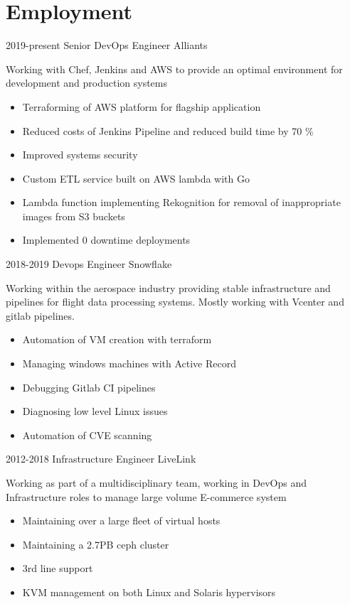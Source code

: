 \documentclass[]{friggeri-cv-a4}
\begin{document}
\section{Employment}
 \begin{entrylist}
  \entry
  	{2019-present}
  	{Senior DevOps Engineer}
  	{Alliants}
  	{Working with Chef, Jenkins and AWS to provide an optimal environment for development and production systems
      \begin{itemize}
        \item Terraforming of AWS platform for flagship application
        \item Reduced costs of Jenkins Pipeline and reduced build time by 70 \%
        \item Improved systems security
        \item Custom ETL service built on AWS lambda with Go
        \item Lambda function implementing Rekognition for removal of inappropriate images from S3 buckets
        \item Implemented 0 downtime deployments
      \end{itemize}}
  \entry 
  	{2018-2019}
  	{Devops Engineer}
  	{Snowflake}
  	{
      Working within the aerospace industry providing stable infrastructure and pipelines for flight data processing systems. Mostly working with Vcenter and gitlab pipelines.
      \begin{itemize}
        \item Automation of VM creation with terraform
        \item Managing windows machines with Active Record
        \item Debugging Gitlab CI pipelines
        \item Diagnosing low level Linux issues
        \item Automation of CVE scanning
      \end{itemize}
    }
  \entry
  	{2012-2018}
  	{Infrastructure Engineer}
  	{LiveLink}
  	{
      Working as part of a multidisciplinary team, working in DevOps and Infrastructure roles to manage large volume E-commerce system
    \begin{itemize}
      \item Maintaining over a large fleet of virtual hosts
      \item Maintaining a 2.7PB ceph cluster
      \item 3rd line support
      \item KVM management on both Linux and Solaris hypervisors

\end{itemize}}
\end{entrylist}
\end{document}
